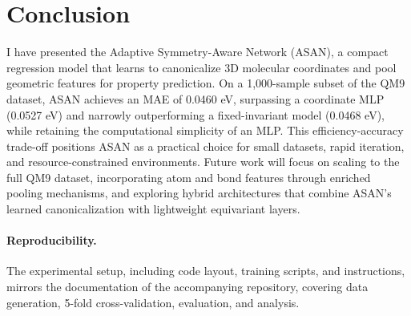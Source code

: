 \documentclass[12pt]{article}
\begin{document}
\section{Conclusion}
I have presented the Adaptive Symmetry-Aware Network (ASAN), a compact regression model that learns to canonicalize 3D molecular coordinates and pool geometric features for property prediction. On a 1,000-sample subset of the QM9 dataset, ASAN achieves an MAE of 0.0460 eV, surpassing a coordinate MLP (0.0527 eV) and narrowly outperforming a fixed-invariant model (0.0468 eV), while retaining the computational simplicity of an MLP. This efficiency-accuracy trade-off positions ASAN as a practical choice for small datasets, rapid iteration, and resource-constrained environments. Future work will focus on scaling to the full QM9 dataset, incorporating atom and bond features through enriched pooling mechanisms, and exploring hybrid architectures that combine ASAN’s learned canonicalization with lightweight equivariant layers.

\paragraph{Reproducibility.} The experimental setup, including code layout, training scripts, and instructions, mirrors the documentation of the accompanying repository, covering data generation, 5-fold cross-validation, evaluation, and analysis.
\end{document}
